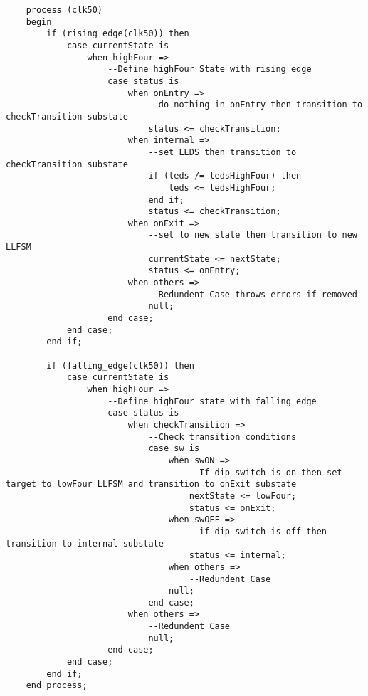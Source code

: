 \documentclass{article}
\begin{document}
	\begin{lstlisting}
	process (clk50)
	begin
		if (rising_edge(clk50)) then
			case currentState is
				when highFour =>
					--Define highFour State with rising edge
					case status is
						when onEntry =>
							--do nothing in onEntry then transition to checkTransition substate
							status <= checkTransition;
						when internal =>
							--set LEDS then transition to checkTransition substate
							if (leds /= ledsHighFour) then
								leds <= ledsHighFour;
							end if;
							status <= checkTransition;
						when onExit =>
							--set to new state then transition to new LLFSM
							currentState <= nextState;
							status <= onEntry;
						when others =>
							--Redundent Case throws errors if removed
							null;
					end case;
			end case;
		end if;
		
		if (falling_edge(clk50)) then
			case currentState is
				when highFour =>
					--Define highFour state with falling edge
					case status is
						when checkTransition =>
							--Check transition conditions
							case sw is
								when swON =>
									--If dip switch is on then set target to lowFour LLFSM and transition to onExit substate
									nextState <= lowFour;
									status <= onExit;
								when swOFF =>
									--if dip switch is off then transition to internal substate
									status <= internal;
								when others =>
									--Redundent Case
								null;
							end case;
						when others =>
							--Redundent Case
							null;
					end case;
			end case;
		end if;
	end process;
	\end{lstlisting}
	
\end{document}
